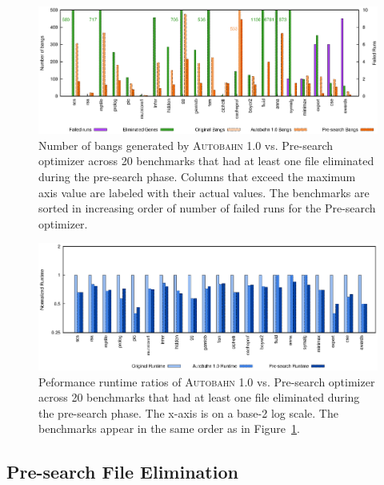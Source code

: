 \documentclass[format=sigplan, review=true, 9pt]{acmart}
\newcommand{\figref}[1]{Figure~\ref{#1}}
\newcommand{\Ao}[0]{\textsc{Autobahn 1.0}}
\newcommand{\preopt}[0]{pre-search}
\newcommand{\Preopt}[0]{Pre-search}
\begin{document}
\begin{figure}
\includegraphics[width=\textwidth]{pre-aut-bangs}
\caption{Number of bangs generated by \Ao{} vs. \Preopt{} optimizer across 20 benchmarks that had at least
one file eliminated during the \preopt{} phase. Columns that exceed
the maximum axis value are labeled with their actual values. The
benchmarks are sorted in increasing order of number of failed runs for
the \Preopt{} optimizer.}
\label{fig:preopt-bangs}
\end{figure}

\begin{figure}
\includegraphics[width=\textwidth]{pre-aut}
\caption{Peformance runtime ratios of \Ao{} vs. \Preopt{} optimizer
across 20 benchmarks that had at least one
file eliminated during the \preopt{} phase. The x-axis 
is on a base-2 log scale. The benchmarks appear in the same order as
in \figref{fig:preopt-bangs}.}
\label{fig:preopt-runtime}
\end{figure}

\subsection{\Preopt{} File Elimination}
\label{sec:file-elim}
\end{document}

